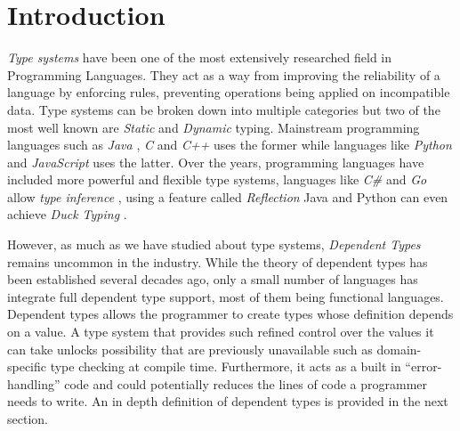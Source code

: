 \documentclass[a4paper,12pt]{report}
\begin{document}
\pagestyle{empty}
\singlespacing

\onehalfspacing

\singlespacing


\setcounter{page}{0}
\pagestyle{plain}
\tableofcontents
\listoffigures
\listoftables

\onehalfspacing


\chapter{Introduction}
\setcounter{page}{1} 
\textit{Type systems} \cite{typesystem} have been one of the most extensively researched field in 
Programming Languages. They act as a way from improving the reliability of a 
language by enforcing rules, preventing operations being applied on 
incompatible data. Type systems can be broken down into multiple categories but 
two of the most well known are \textit{Static} \cite{staticTyping} and 
\textit{Dynamic} \cite{dynamicTyping} typing. Mainstream programming 
languages such as \textit{Java} \cite{java}, \textit{C} \cite{c} and \textit{C++} \cite{cpp} 
uses the former while languages like \textit{Python} \cite{python} and 
\textit{JavaScript} \cite{js} uses the latter. 
Over the years, programming languages have included more powerful and flexible 
type systems, languages like \textit{C\#} \cite{cSharp} and \textit{Go} \cite{goInferenceType} allow 
\textit{type inference} \cite{inferenceType}, using a feature called \textit{Reflection} 
Java and Python can even achieve \textit{Duck Typing} \cite{javaDuckType}.
\par
However, as much as we have studied about type systems, \textit{Dependent Types} 
\cite{depenTypeAtWork} remains uncommon in the industry. While the theory of dependent types has been 
established several decades ago, only a small number of languages has 
integrate full dependent type support, most of them being functional languages. 
Dependent types allows the programmer to create types whose definition depends 
on a value. A type system that provides such refined control over the values it 
can take unlocks possibility that are previously unavailable such as 
domain-specific type checking at compile time. Furthermore, it acts as a built 
in ``error-handling'' code and could potentially 
reduces the lines of code a programmer needs to write. An in depth 
definition of dependent types is provided in the next section.
\end{document}
